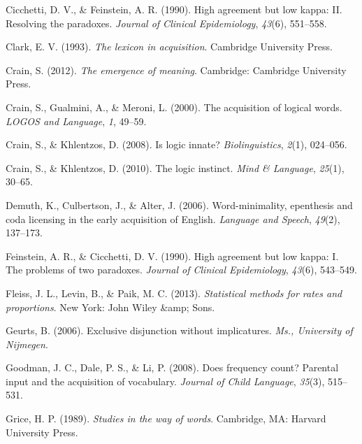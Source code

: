 \documentclass[,man,floatsintext]{apa6}
\begin{document}
\leavevmode\hypertarget{ref-cicchetti1990high}{}%
Cicchetti, D. V., \& Feinstein, A. R. (1990). High agreement but low kappa: II. Resolving the paradoxes. \emph{Journal of Clinical Epidemiology}, \emph{43}(6), 551--558.

\leavevmode\hypertarget{ref-clark1993lexicon}{}%
Clark, E. V. (1993). \emph{The lexicon in acquisition}. Cambridge University Press.

\leavevmode\hypertarget{ref-crain2012emergence}{}%
Crain, S. (2012). \emph{The emergence of meaning}. Cambridge: Cambridge University Press.

\leavevmode\hypertarget{ref-crain2000acquisition}{}%
Crain, S., Gualmini, A., \& Meroni, L. (2000). The acquisition of logical words. \emph{LOGOS and Language}, \emph{1}, 49--59.

\leavevmode\hypertarget{ref-crain2008logic}{}%
Crain, S., \& Khlentzos, D. (2008). Is logic innate? \emph{Biolinguistics}, \emph{2}(1), 024--056.

\leavevmode\hypertarget{ref-crain2010logic}{}%
Crain, S., \& Khlentzos, D. (2010). The logic instinct. \emph{Mind \& Language}, \emph{25}(1), 30--65.

\leavevmode\hypertarget{ref-demuth2006word}{}%
Demuth, K., Culbertson, J., \& Alter, J. (2006). Word-minimality, epenthesis and coda licensing in the early acquisition of English. \emph{Language and Speech}, \emph{49}(2), 137--173.

\leavevmode\hypertarget{ref-feinstein1990high}{}%
Feinstein, A. R., \& Cicchetti, D. V. (1990). High agreement but low kappa: I. The problems of two paradoxes. \emph{Journal of Clinical Epidemiology}, \emph{43}(6), 543--549.

\leavevmode\hypertarget{ref-fleiss2013statistical}{}%
Fleiss, J. L., Levin, B., \& Paik, M. C. (2013). \emph{Statistical methods for rates and proportions}. New York: John Wiley \&amp; Sons.

\leavevmode\hypertarget{ref-geurts2006exclusive}{}%
Geurts, B. (2006). Exclusive disjunction without implicatures. \emph{Ms., University of Nijmegen}.

\leavevmode\hypertarget{ref-goodman2008does}{}%
Goodman, J. C., Dale, P. S., \& Li, P. (2008). Does frequency count? Parental input and the acquisition of vocabulary. \emph{Journal of Child Language}, \emph{35}(3), 515--531.

\leavevmode\hypertarget{ref-grice1989studies}{}%
Grice, H. P. (1989). \emph{Studies in the way of words}. Cambridge, MA: Harvard University Press.
\end{document}
